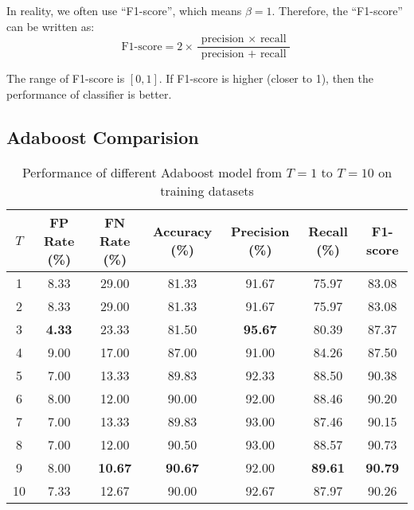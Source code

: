 \documentclass{article}[12pt]
\begin{document}
In reality, we often use ``F1-score'', which means $\beta=1$. Therefore, the ``F1-score'' can be written as:
\begin{equation}
    \text {F1-score}=2 \times \frac{\text { precision } \times \text { recall }}{\text { precision }+\text { recall }}
\end{equation}

The range of F1-score is $[0, 1]$. If F1-score is higher (closer to 1), 
then the performance of classifier is better.

\subsection{Adaboost Comparision} \label{subsec:ada_comp}

\begin{table}[H]
    \centering    
    \caption{Performance of different Adaboost model from $T=1$ to $T=10$ on training datasets}
    \begin{tabular}{@{}ccccccc@{}}
        \toprule
        $T$  & FP Rate (\%)  & FN Rate (\%)   & Accuracy (\%)  & Precision (\%)   & Recall (\%)      & F1-score         \\ \midrule
        1  & 8.33          & 29.00          & 81.33          & 91.67        & 75.97        & 83.08        \\
        2  & 8.33          & 29.00          & 81.33          & 91.67        & 75.97        & 83.08        \\
        3  & \textbf{4.33} & 23.33          & 81.50          & \textbf{95.67}        & 80.39        & 87.37        \\
        4  & 9.00          & 17.00          & 87.00          & 91.00        & 84.26        & 87.50        \\
        5  & 7.00          & 13.33          & 89.83          & 92.33        & 88.50        & 90.38        \\
        6  & 8.00          & 12.00 & 90.00          & 92.00        & 88.46        & 90.20        \\
        7  & 7.00          & 13.33          & 89.83          & 93.00 & 87.46        & 90.15        \\
        8  & 7.00          & 12.00 & 90.50          & 93.00        & 88.57        & 90.73        \\
        9  & 8.00          & \textbf{10.67}          & \textbf{90.67} & 92.00        & \textbf{89.61} & \textbf{90.79} \\
        10 & 7.33          & 12.67          & 90.00          & 92.67        & 87.97        & 90.26        \\ \bottomrule
        \end{tabular}
        \label{tab:ada_train}
\end{table}
\end{document}
